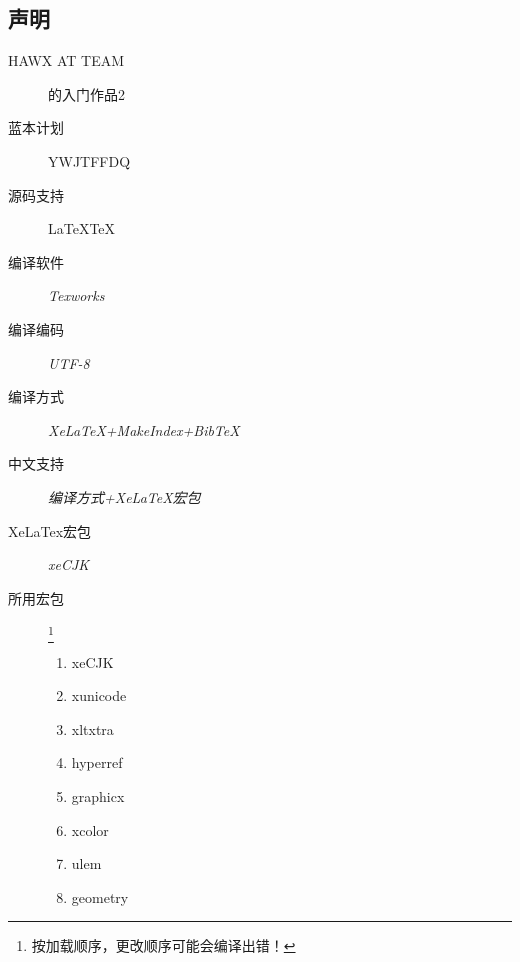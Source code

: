 \subsection{声明}
\begin{description}
\item[HAWX AT TEAM]的入门作品2
\item[蓝本计划]YWJTFFDQ
\item[源码支持]\LaTeXe  \LaTeX  \TeX
\item[编译软件]\emph{Texworks}
\item[编译编码]\emph{UTF-8}
\item[编译方式]\emph{XeLaTeX+MakeIndex+BibTeX}
\item[中文支持]\emph{编译方式+XeLaTeX宏包}
\item[XeLaTex宏包]\emph{xeCJK}
\item[所用宏包]\footnote{按加载顺序，更改顺序可能会编译出错！}
\begin{enumerate}
\item xeCJK
\item xunicode
\item xltxtra
\item hyperref
\item graphicx
\item xcolor
\item ulem
\item geometry
\end{enumerate}
\end{description}
